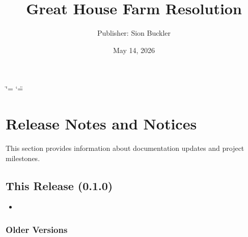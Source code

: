 \documentclass[letterpaper,10pt,openany,oneside,english]{sphinxmanual}
\title{Great House Farm Resolution}
\date{May 14, 2026}
\author{Publisher: Sion Buckler}
\begin{document}
\ifdefined\shorthandoff
  \ifnum\catcode`\=\string=\active\shorthandoff{=}\fi
  \ifnum\catcode`\"=\active{}\fi
\fi

\pagestyle{empty}
\sphinxmaketitle
\pagestyle{plain}
\sphinxtableofcontents
\pagestyle{normal}
\label{\detokenize{index::doc}}


\sphinxstepscope


\chapter{Release Notes and Notices}
\label{\detokenize{releasenotes:release-notes-and-notices}}\label{\detokenize{releasenotes::doc}}
\sphinxAtStartPar
This section provides information about documentation updates and project milestones.


\section{This Release (0.1.0)}
\label{\detokenize{releasenotes:this-release-0-1-0}}\begin{itemize}
\item {} 
\sphinxAtStartPar
{} \sphinxhyphen{} 

\end{itemize}


\subsection{Older Versions}
\label{\detokenize{releasenotes:older-versions}}
\end{document}
